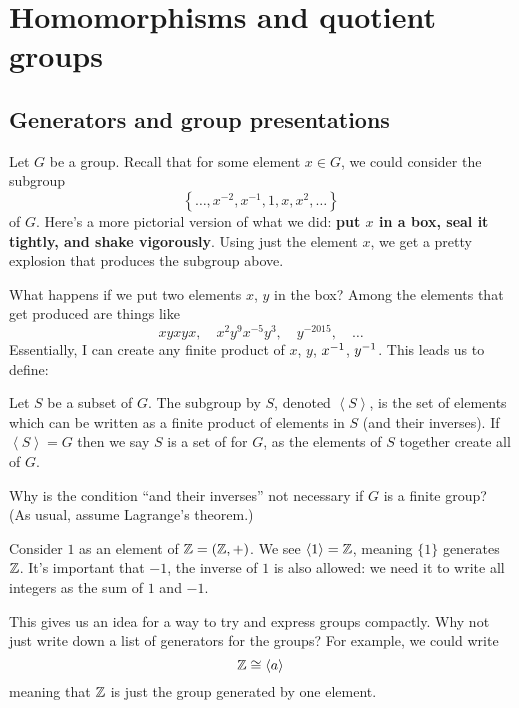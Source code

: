 \chapter{Homomorphisms and quotient groups}
\section{Generators and group presentations}

Let $G$ be a group.
Recall that for some element $x \in G$,
we could consider the subgroup
\[ \left\{ \dots, x^{-2}, x^{-1}, 1, x, x^2, \dots \right\} \]
of $G$.
Here's a more pictorial version of what we did:
\textbf{put $x$ in a box, seal it tightly, and shake vigorously}.
Using just the element $x$,
we get a pretty explosion that produces the subgroup above.

What happens if we put two elements $x$, $y$ in the box?
Among the elements that get produced are things like
\[ xyxyx, \quad x^2y^9x^{-5}y^3, \quad y^{-2015}, \quad \dots\]
Essentially, I can create any finite product of $x$, $y$, $x^{-1}$, $y^{-1}$.
This leads us to define:
\begin{definition}
	Let $S$ be a subset of $G$.
	The subgroup  by $S$,
	denoted $\left<S\right>$,
	is the set of elements which can be written as a
	finite product of elements in $S$ (and their inverses).
	If $\left<S\right> = G$ then we say $S$ is a set of
	 for $G$,
	as the elements of $S$ together create all of $G$.
\end{definition}
\begin{exercise}
	Why is the condition ``and their inverses''
	not necessary if $G$ is  a finite group?
	(As usual, assume Lagrange's theorem.)
\end{exercise}

\begin{example}
	Consider $1$ as an element of $\mathbb Z = (\mathbb Z, +)$.
	We see $\left<1\right> = \mathbb Z$, meaning $\{1\}$ generates $\mathbb Z$.
	It's important that $-1$, the inverse of $1$ is also allowed:
	we need it to write all integers as the sum of $1$ and $-1$.
\end{example}

This gives us an idea for a way to try and express groups compactly.
Why not just write down a list of generators for the groups?
For example, we could write
\[ \mathbb Z \cong \left< a \right> \]
meaning that $\mathbb Z$ is just the group generated by one element.

